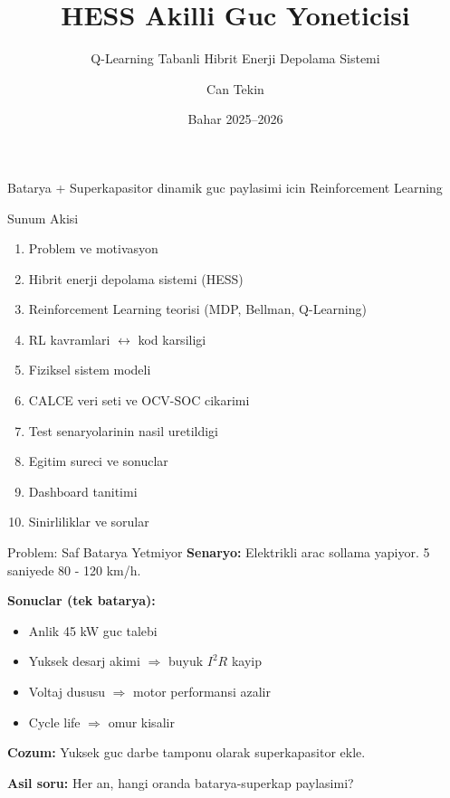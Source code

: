 \documentclass[10pt,aspectratio=169]{beamer}
\title[HESS Q-Learning]{HESS Akilli Guc Yoneticisi}
\subtitle{Q-Learning Tabanli Hibrit Enerji Depolama Sistemi}
\author{Can Tekin}
\institute{BTU EEM --- EUYZ458}
\date{Bahar 2025--2026}
\begin{document}
\begin{frame}
\titlepage
\centering
\small Batarya + Superkapasitor dinamik guc paylasimi icin Reinforcement Learning
\end{frame}

\begin{frame}{Sunum Akisi}
\begin{enumerate}
  \item Problem ve motivasyon
  \item Hibrit enerji depolama sistemi (HESS)
  \item Reinforcement Learning teorisi (MDP, Bellman, Q-Learning)
  \item RL kavramlari $\leftrightarrow$ kod karsiligi
  \item Fiziksel sistem modeli
  \item CALCE veri seti ve OCV-SOC cikarimi
  \item Test senaryolarinin nasil uretildigi
  \item Egitim sureci ve sonuclar
  \item Dashboard tanitimi
  \item Sinirliliklar ve sorular
\end{enumerate}
\end{frame}

\begin{frame}{Problem: Saf Batarya Yetmiyor}
\textbf{Senaryo:} Elektrikli arac sollama yapiyor. 5 saniyede 80 - 120 km/h.

\vspace{0.5em}
\textbf{Sonuclar (tek batarya):}
\begin{itemize}
  \item Anlik 45 kW guc talebi
  \item Yuksek desarj akimi $\Rightarrow$ buyuk $I^2 R$ kayip
  \item Voltaj dususu $\Rightarrow$ motor performansi azalir
  \item Cycle life $\Rightarrow$ omur kisalir
\end{itemize}

\vspace{0.5em}
\textbf{Cozum:} Yuksek guc darbe tamponu olarak superkapasitor ekle.

\vspace{0.5em}
\begin{tcolorbox}[colback=orange!8,colframe=orange!60!black,boxrule=0.4pt]
\textbf{Asil soru:} Her an, hangi oranda batarya-superkap paylasimi?
\end{tcolorbox}
\end{frame}
\end{document}
